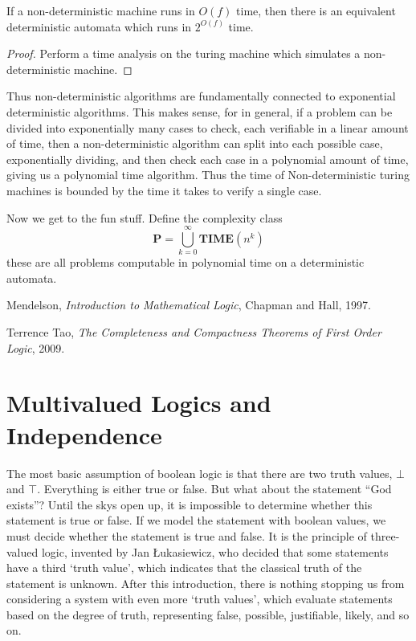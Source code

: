 \begin{theorem}
    If a non-deterministic machine runs in $O(f)$ time, then there is an equivalent deterministic automata which runs in $2^{O(f)}$ time.
\end{theorem}
\begin{proof}
    Perform a time analysis on the turing machine which simulates a non-deterministic machine.
\end{proof}

Thus non-deterministic algorithms are fundamentally connected to exponential deterministic algorithms. This makes sense, for in general, if a problem can be divided into exponentially many cases to check, each verifiable in a linear amount of time, then a non-deterministic algorithm can split into each possible case, exponentially dividing, and then check each case in a polynomial amount of time, giving us a polynomial time algorithm. Thus the time of Non-deterministic turing machines is bounded by the time it takes to verify a single case.

Now we get to the fun stuff. Define the complexity class
%
\[ \textbf{P} = \bigcup_{k = 0}^\infty \textbf{TIME}(n^k) \]
%
these are all problems computable in polynomial time on a deterministic automata.


\begin{thebibliography}{9}

    Mendelson,
    \emph{Introduction to Mathematical Logic},
    Chapman and Hall,
    1997.

    Terrence Tao,
    \emph{The Completeness and Compactness Theorems of First Order Logic},
    2009.

\end{thebibliography}



















\section{Multivalued Logics and Independence}

The most basic assumption of boolean logic is that there are two truth values, $\bot$ and $\top$. Everything is either true or false. But what about the statement ``God exists''? Until the skys open up, it is impossible to determine whether this statement is true or false. If we model the statement with boolean values, we must decide whether the statement is true and false. It is the principle of three-valued logic, invented by Jan \L ukasiewicz, who decided that some statements have a third `truth value', which indicates that the classical truth of the statement is unknown. After this introduction, there is nothing stopping us from considering a system with even more `truth values', which evaluate statements based on the degree of truth, representing false, possible, justifiable, likely, and so on.

